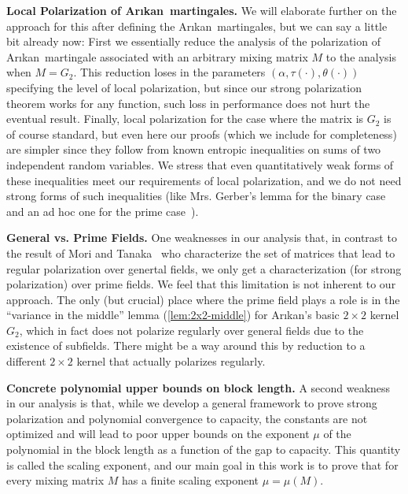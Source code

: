 \documentclass[11pt]{article}
\newcommand{\Arikan}{Ar\i kan}
\begin{document}
\medskip\noindent\textbf{Local Polarization of \Arikan\ martingales.}
We will elaborate further on the approach for this after defining the \Arikan\ martingales, but we can say a little bit already now: First we essentially reduce the analysis of the polarization of \Arikan\ martingale associated with an arbitrary mixing matrix $M$
to the analysis when $M = G_2$. This reduction loses in the parameters
$(\alpha,\tau(\cdot),\theta(\cdot))$ specifying the level of local polarization, but since our strong polarization theorem works for any function, such loss in performance does not hurt the eventual result.
Finally, local polarization for the case where the matrix is $G_2$ is of course standard, but even here our proofs (which we include for completeness)
are simpler since they follow from known entropic inequalities on sums of two independent random variables. We stress that even quantitatively weak forms of these inequalities meet our requirements of local polarization, and we do not need strong forms of such inequalities (like Mrs. Gerber's lemma for the binary case~\cite{sasoglu-book,GX15} and an ad hoc one for the prime case~\cite{GV15}).

\medskip\noindent\textbf{General vs. Prime Fields.}
One weaknesses in our analysis that, in contrast to the result of Mori and Tanaka~\cite{mori-tanaka} who characterize the set of matrices that lead to regular polarization over genertal fields, we only get a characterization (for strong polarization) over prime fields. We feel that this limitation is not inherent to our approach. The only (but crucial) place where the prime field plays a role is in the ``variance in the middle'' lemma (\cref{lem:2x2-middle}) for \Arikan's basic $2 \times 2$ kernel $G_2$, which in fact does not polarize regularly over general fields due to the existence of subfields. There might be a way around this by reduction to a different $2 \times 2$ kernel that actually polarizes regularly.

\medskip \noindent \textbf{Concrete polynomial upper bounds on block length.}
A second weakness in our analysis is that, while we develop a general framework to prove strong polarization and polynomial convergence to capacity, the constants are not
optimized and will lead to poor upper bounds on the exponent $\mu$ of
the polynomial in the block length as a function of the gap to capacity. This quantity is called the scaling exponent, and our main goal in this work is to prove that for every mixing matrix $M$ has a finite scaling exponent $\mu =\mu(M)$. 
\end{document}
